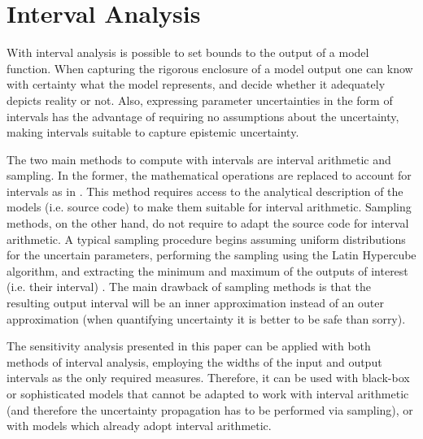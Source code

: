 \documentclass[twocolumn]{rps-esrel2022}
\begin{document}
\section{Interval Analysis}

With interval analysis is possible to set bounds to the output of a model function.
When capturing the rigorous enclosure of a model output one can know with certainty what the model represents, and decide
whether it adequately depicts reality or not.
Also, expressing parameter uncertainties in the form of intervals has the advantage of requiring no assumptions about the uncertainty, making intervals suitable to
capture epistemic uncertainty.

The two main methods to compute with intervals are interval arithmetic and sampling.
In the former, the mathematical operations are replaced to account for intervals as in \cite{moore2009introduction}.
This method requires access to the analytical description of the models (i.e. source code) to make them suitable for
interval arithmetic.
Sampling methods, on the other hand, do not require to adapt the source code for interval arithmetic.
A typical sampling procedure begins assuming uniform distributions for the uncertain parameters, performing
the sampling using the Latin Hypercube algorithm, and extracting the minimum and maximum of the outputs of interest (i.e. their
interval) \cite{helton2010representation}.
The main drawback of sampling methods is that the resulting output interval will be an inner approximation instead of an outer approximation
(when quantifying uncertainty it is better to be safe than sorry).

The sensitivity analysis presented in this paper can be applied with both methods of interval analysis, employing the widths of the input and output intervals as
the only required measures.
Therefore, it can be used with black-box or sophisticated models that cannot be adapted to work with interval arithmetic (and therefore the uncertainty propagation
has to be performed via sampling), or with models which already adopt interval arithmetic.

\end{document}

